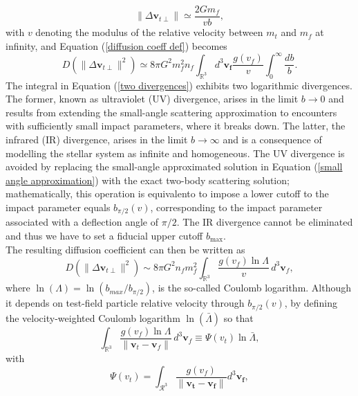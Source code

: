 \documentclass[12pt,twoside,openany]{book}
\begin{document}
\begin{equation}\label{small angle approximation}
    \|\Delta \mathbf{v}_{t\perp} \|\simeq \frac{2Gm_f}{vb},
\end{equation}
with $v$ denoting the modulus of the relative velocity between $m_t$ and $m_f$ at infinity,
and Equation (\ref{diffusion coeff def}) becomes
\begin{equation}\label{two divergences}
    D(\|\Delta \mathbf{v}_{t\perp} \|^2)\simeq 8\pi G^2m_f^2n_f\int_{\mathbb{R}^3}d^3\mathbf{v_f}\frac{g(v_f)}{v}\int_0^\infty \frac{db}{b}.
\end{equation}
The integral in Equation (\ref{two divergences}) exhibits two logarithmic divergences. The former, known as ultraviolet (UV) divergence, arises in the limit $b\rightarrow 0$ and results from extending the small-angle scattering approximation to encounters with sufficiently small impact parameters, where it breaks down. The latter, the infrared (IR) divergence, arises in the limit $b\rightarrow\infty$ and is a consequence of modelling the stellar system as infinite and homogeneous. The UV divergence is avoided by replacing the small-angle approximated solution in Equation (\ref{small angle approximation}) with the exact two-body scattering solution; mathematically, this operation is equivalento to impose a lower cutoff to the impact parameter equals $b_{\pi/2}(v)$, corresponding to the impact parameter associated with a deflection angle of $\pi/2$. The IR divergence cannot be eliminated and thus we have to set a fiducial  upper cutoff $b_{\max}$.\\The resulting diffusion coefficient can then be written as
\begin{equation}\label{diffusion with C log}
D(\|\Delta \mathbf{v}_{t\perp}\|^2) \sim 8\pi G^2 n_f m_f^2 \int_{\mathbb{R}^3} \frac{g(v_f)\ln \Lambda}{v} \, d^3 \mathbf{v}_f,
\end{equation}
where $\ln{(\Lambda)}=\ln{(b_{max}/b_{\pi/2})}$, is the so-called Coulomb logarithm. Although it depends on test-field particle relative velocity through $b_{\pi/2}(v)$, by defining the velocity-weighted Coulomb logarithm $\ln{(\bar{\Lambda})}$ so that
\begin{equation}
\int_{\mathbb{R}^3} \frac{g(v_f)\ln \Lambda}{\|\mathbf{v}_t - \mathbf{v}_f\|} \, d^3 \mathbf{v}_f
\equiv \Psi(v_t)\ln{\bar{\Lambda}},
\end{equation}
with
\begin{equation}\label{Rosenbluth potential}
    \Psi(v_t)=\int_{\mathcal{R}^3}\frac{g(v_f)}{\|\mathbf{v_t}-\mathbf{v_f}\|}d^3\mathbf{v_f},
\end{equation}
\end{document}
